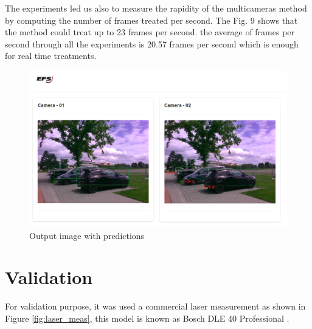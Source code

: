 The experiments led us also to measure the rapidity of the multicameras method by computing the number of frames treated per second.  The Fig. 9 shows that the method could treat up to 23 frames per second. the average of frames per second through all the experiments is 20.57 frames per second which is enough for real time treatments. 

\begin{figure}[H]
\centering
\includegraphics[scale=0.8]{imagens/output_framework.png}
\caption{Output image with predictions }
\label{fig:framework_predict}
\end{figure}



\section{Validation}

For validation purpose, it was used a commercial laser measurement as shown in Figure \ref{fig:laser_meas}, this model is known as Bosch DLE 40 Professional {\tiny{\textregistered}}. 



